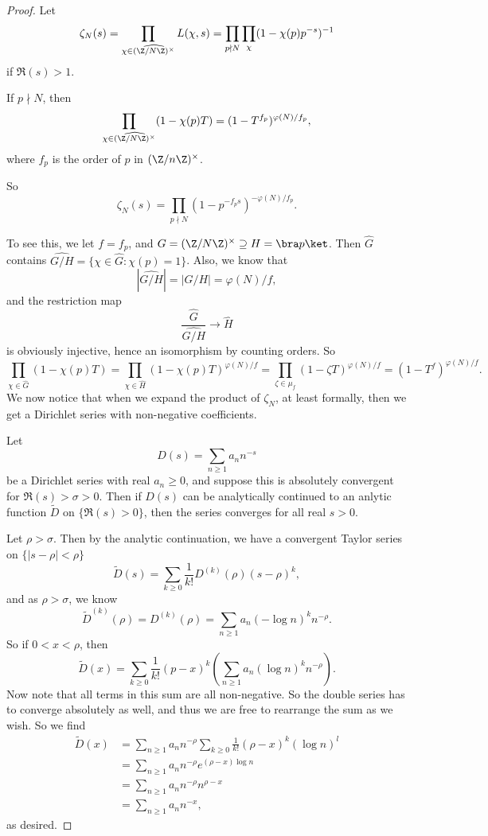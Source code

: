 \documentclass[a4paper]{article}
\begin{document}
\begin{proof}
  Let
  \[
    \zeta_N(s) = \prod_{\chi \in \widehat{(\Z/N\Z)^\times}} L(\chi, s) = \prod_{p \nmid N} \prod_\chi (1 - \chi(p) p^{-s})^{-1}
  \]
  if $\Re(s) > 1$.

  \begin{claim}
    If $p \nmid N$, then
    \[
      \prod_{\chi \in \widehat{(\Z/N\Z)^\times}} (1 - \chi(p) T) = (1 - T^{f_p})^{\varphi(N)/f_p},
    \]
    where $f_p$ is the order of $p$ in $(\Z/n\Z)^\times$.

    So
    \[
      \zeta_N(s) = \prod_{p \nmid N} (1 - p^{-f_p s})^{-\varphi(N)/f_p}.
    \]
  \end{claim}
  To see this, we let $f = f_p$, and $G = (\Z/N\Z)^\times \supseteq H = \bra p\ket$. Then $\hat{G}$ contains $\widehat{G/H}= \{\chi \in \hat{G}: \chi(p) = 1\}$. Also, we know that
  \[
    |\widehat{G/H}| = |G/H| = \varphi(N)/f,
  \]
  and the restriction map
  \[
    \frac{\hat{G}}{\hat{G/H}} \to \hat{H}
  \]
  is obviously injective, hence an isomorphism by counting orders. So
  \[
    \prod_{\chi \in \hat{G}} (1 - \chi(p) T) = \prod_{\chi \in \hat{H}}(1 - \chi(p) T)^{\varphi(N)/f} = \prod_{\zeta \in \mu_f}(1 - \zeta T)^{\varphi(N)/f} = (1 - T^f)^{\varphi(N)/f}.
  \]
  We now notice that when we expand the product of $\zeta_N$, at least formally, then we get a Dirichlet series with non-negative coefficients.
  \begin{claim}
    Let
    \[
      D(s) = \sum_{n \geq 1} a_n n^{-s}
    \]
    be a Dirichlet series with real $a_n \geq 0$, and suppose this is absolutely convergent for $\Re(s) > \sigma > 0$. Then if $D(s)$ can be analytically continued to an anlytic function $\tilde{D}$ on $\{\Re(s) > 0\}$, then the series converges for all real $s > 0$.
  \end{claim}
  Let $\rho > \sigma$. Then by the analytic continuation, we have a convergent Taylor series on $\{|s - \rho| < \rho\}$
  \[
    \tilde{D}(s) = \sum_{k \geq 0} \frac{1}{k!} D^{(k)}(\rho) (s - \rho)^k,
  \]
  and as $\rho > \sigma$, we know
  \[
    \tilde{D}^{(k)}(\rho) = D^{(k)} (\rho) = \sum_{n\geq 1} a_n (-\log n)^k n^{-\rho}.
  \]
  So if $0 < x < \rho$, then
  \[
    \tilde{D}(x) = \sum_{k \geq 0} \frac{1}{k!} (p - x)^k \left(\sum_{n \geq 1} a_n (\log n)^k n^{-\rho}\right).
  \]
  Now note that all terms in this sum are all non-negative. So the double series has to converge absolutely as well, and thus we are free to rearrange the sum as we wish. So we find
  \begin{align*}
    \tilde{D}(x) &= \sum_{n \geq 1} a_n n^{-\rho} \sum_{k \geq 0} \frac{1}{k!} (\rho - x)^k (\log n)^l\\
    &= \sum_{n \geq 1} a_n n^{-\rho} e^{(\rho - x) \log n}\\
    &= \sum_{n \geq 1} a_n n^{-\rho} n^{\rho - x}\\
    &= \sum_{n \geq 1} a_n n^{-x},
  \end{align*}
  as desired.


\end{proof}
\end{document}

